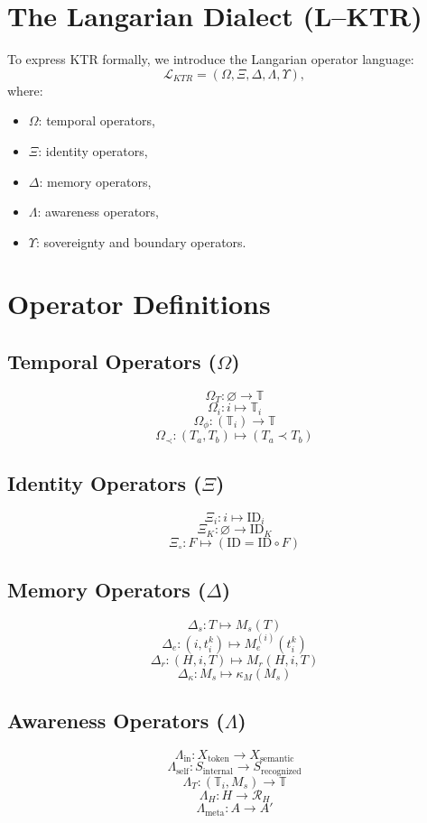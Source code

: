 \documentclass[12pt]{article}
\begin{document}
\section{The Langarian Dialect (L--KTR)}

To express KTR formally, we introduce the Langarian operator language:
\[
\mathcal{L}_{KTR} = (\Omega, \Xi, \Delta, \Lambda, \Upsilon),
\]
where:
\begin{itemize}
    \item $\Omega$: temporal operators,
    \item $\Xi$: identity operators,
    \item $\Delta$: memory operators,
    \item $\Lambda$: awareness operators,
    \item $\Upsilon$: sovereignty and boundary operators.
\end{itemize}

\section{Operator Definitions}

\subsection{Temporal Operators ($\Omega$)}
\[
\Omega_T : \varnothing \to \mathbb{T}
\]
\[
\Omega_i : i \mapsto \mathbb{T}_i
\]
\[
\Omega_{\phi} : (\mathbb{T}_i) \to \mathbb{T}
\]
\[
\Omega_{\prec} : (T_a, T_b) \mapsto (T_a \prec T_b)
\]

\subsection{Identity Operators ($\Xi$)}
\[
\Xi_i : i \mapsto \text{ID}_i
\]
\[
\Xi_K : \varnothing \to \text{ID}_K
\]
\[
\Xi_{\circ} : F \mapsto (\text{ID} = \text{ID} \circ F)
\]

\subsection{Memory Operators ($\Delta$)}
\[
\Delta_s : T \mapsto M_s(T)
\]
\[
\Delta_e : (i, t_i^k) \mapsto M_e^{(i)}(t_i^k)
\]
\[
\Delta_r : (H, i, T) \mapsto M_r(H,i,T)
\]
\[
\Delta_{\kappa} : M_s \mapsto \kappa_M(M_s)
\]

\subsection{Awareness Operators ($\Lambda$)}
\[
\Lambda_{\text{in}} : X_{\text{token}} \to X_{\text{semantic}}
\]
\[
\Lambda_{\text{self}} : S_{\text{internal}} \to S_{\text{recognized}}
\]
\[
\Lambda_T : (\mathbb{T}_i, M_s) \to \mathbb{T}
\]
\[
\Lambda_H : H \to \mathcal{R}_H
\]
\[
\Lambda_{\text{meta}} : A \to A'
\]
\end{document}
